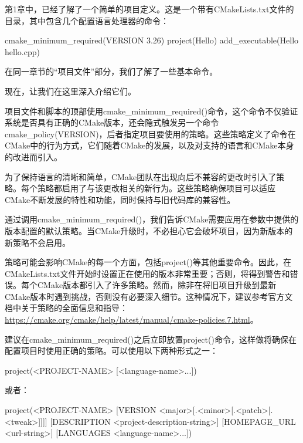 第1章中，已经了解了一个简单的项目定义。这是一个带有CMakeLists.txt文件的目录，其中包含几个配置语言处理器的命令：


\begin{cmake}
cmake_minimum_required(VERSION 3.26)
project(Hello)
add_executable(Hello hello.cpp)
\end{cmake}

在同一章节的“项目文件”部分，我们了解了一些基本命令。

现在，让我们在这里深入介绍它们。


项目文件和脚本的顶部使用cmake\_minimum\_required()命令，这个命令不仅验证系统是否具有正确的CMake版本，还会隐式触发另一个命令cmake\_policy(VERSION)，后者指定项目要使用的策略。这些策略定义了命令在CMake中的行为方式，它们随着CMake的发展，以及对支持的语言和CMake本身的改进而引入。

为了保持语言的清晰和简单，CMake团队在出现向后不兼容的更改时引入了策略。每个策略都启用了与该更改相关的新行为。这些策略确保项目可以适应CMake不断发展的特性和功能，同时保持与旧代码库的兼容性。

通过调用cmake\_minimum\_required()，我们告诉CMake需要应用在参数中提供的版本配置的默认策略。当CMake升级时，不必担心它会破坏项目，因为新版本的新策略不会启用。

策略可能会影响CMake的每一个方面，包括project()等其他重要命令。因此，在CMakeLists.txt文件开始时设置正在使用的版本非常重要；否则，将得到警告和错误。每个CMake版本都引入了许多策略。然而，除非在将旧项目升级到最新CMake版本时遇到挑战，否则没有必要深入细节。这种情况下，建议参考官方文档中关于策略的全面信息和指导：\url{https://cmake.org/cmake/help/latest/manual/cmake-policies.7.html}。


建议在cmake\_minimum\_required()之后立即放置project()命令，这样做将确保在配置项目时使用正确的策略。可以使用以下两种形式之一：

\begin{shell}
project(<PROJECT-NAME> [<language-name>...])
\end{shell}

或者：

\begin{shell}
project(<PROJECT-NAME>
        [VERSION <major>[.<minor>[.<patch>[.<tweak>]]]]
        [DESCRIPTION <project-description-string>]
        [HOMEPAGE_URL <url-string>]
        [LANGUAGES <language-name>...])
\end{shell}

